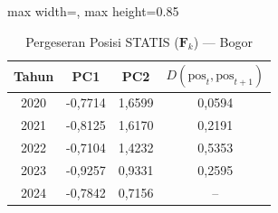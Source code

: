 \begin{table}[H]
\centering
\caption{Pergeseran Posisi STATIS ($\mathbf{F}_k$) --- Bogor} \label{tab:app1jarak_statis_skor_bogor}
\begin{adjustbox}{max width=\textwidth, max height=0.85\textheight}
\begin{tabular}{|c|c|c|c|}
\hline
\textbf{Tahun} & \textbf{PC1} & \textbf{PC2} & \textbf{$D(\text{pos}_t, \text{pos}_{t+1})$} \\
\hline
2020 & -0,7714 & 1,6599 & 0,0594 \\
2021 & -0,8125 & 1,6170 & 0,2191 \\
2022 & -0,7104 & 1,4232 & 0,5353 \\
2023 & -0,9257 & 0,9331 & 0,2595 \\
2024 & -0,7842 & 0,7156 & -- \\
\hline
\end{tabular}
\end{adjustbox}
\end{table}